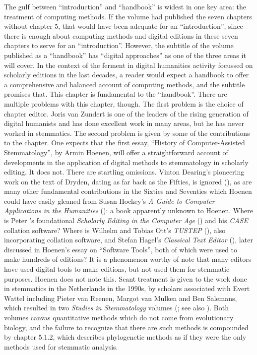 \documentclass{article}
\begin{document}
The gulf between ``introduction'' and ``handbook'' is widest in
one key area: the treatment of computing methods. If the volume had
published the seven chapters without chapter 5, that would have been
adequate for an ``introduction'', since there is enough about computing
methods and digital editions in these seven chapters to serve for an
``introduction''. However, the subtitle of the volume published as a
``handbook'' has ``digital approaches'' as one of the three areas it
will cover. In the context of the ferment in digital humanities activity
focussed on scholarly editions in the last decades, a reader would
expect a handbook to offer a comprehensive and balanced account of
computing methods, and the subtitle promises that. This chapter is
fundamental to the ``handbook''. There are multiple problems with this
chapter, though. The first problem is the choice of chapter editor.
Joris van Zundert is one of the leaders of the rising generation of
digital humanists and has done excellent work in many areas, but he has never worked in stemmatics. The
second problem is given by some of the contributions to the chapter. One
expects that the first essay, ``History of Computer-Assisted
Stemmatology'', by Armin Hoenen, will offer a straightforward account of
developments in the application of digital methods to stemmatology in
scholarly editing. It does not. There are startling omissions. Vinton
Dearing's pioneering work on the text of Dryden, dating as far back as
the Fifties, is ignored (\citeyear{dearing_methods_1962}), as are many other fundamental
contributions in the Sixties and Seventies which Hoenen could have
easily gleaned from Susan Hockey's \emph{A Guide to Computer
Applications in the Humanities} (\citeyear{hockey_guide_1980}): a book apparently unknown to
Hoenen. Where is Peter \citeauthor{shillingsburg_scholarly_1986}'s foundational \emph{Scholarly
Editing in the Computer Age} (\citeyear{shillingsburg_scholarly_1986}) and his \emph{CASE} collation
software? Where is Wilhelm and Tobias Ott's \emph{TUSTEP} (\citeyear{ott_tustep_2011}), also
incorporating collation software, and Stefan Hagel's \emph{Classical
Text Editor} (\citeyear{hagel_classical_1997}), later discussed in Hoenen's essay on ``Software
Tools'', both of which were used to make hundreds of editions? It is a
phenomenon worthy of note that many editors have used digital tools to
make editions, but not used them for stemmatic purposes. Hoenen does not
note this. Scant treatment is given to the work done in stemmatics in
the Netherlands in the 1990s, by scholars associated with Evert Wattel
including Pieter van Reenen, Margot van Mulken and Ben Salemans, which
resulted in two \emph{Studies in Stemmatology} volumes (\cite{reenen_studies_1996}; see also \cite{reenen_studies_2004}). Both volumes canvas
quantitative methods which do not come from evolutionary biology, and
the failure to recognize that there are such methods is compounded by
chapter 5.1.2, which describes phylogenetic methods as if they were the
only methods used for stemmatic analysis.
\end{document}
